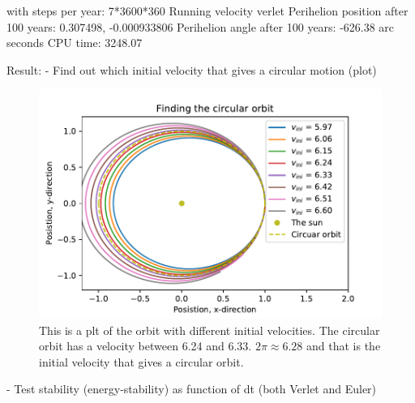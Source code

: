 with steps per year: 7*3600*360
Running velocity verlet
Perihelion position after 100 years: 0.307498, -0.000933806
Perihelion angle after 100 years: -626.38 arc seconds
CPU time: 3248.07


Result:		
	- Find out which initial velocity that gives a circular motion (plot)
\begin{figure}[H]
\includegraphics[width=1.1\linewidth]{../results/plots/circular_orbit.pdf}\caption{This is a plt of the orbit with different initial velocities. The circular orbit has a velocity between 6.24 and 6.33. $2 \pi \approx 6.28$ and that is the initial velocity that gives a circular orbit. }\label{fig:circular_orbit}
\end{figure}

	- Test stability (energy-stability) as function of dt (both Verlet and Euler)
	
